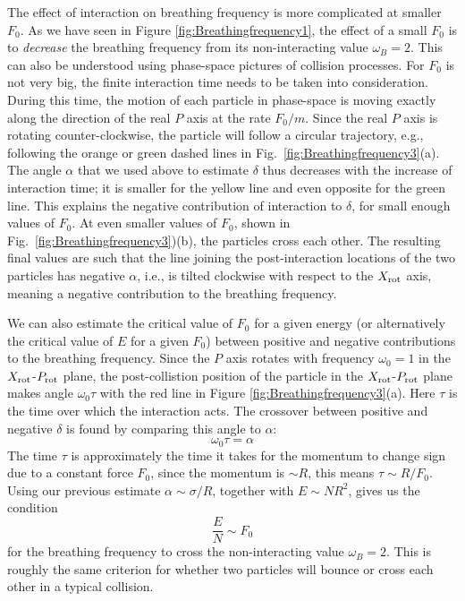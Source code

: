\documentclass[aps,preprintnumbers,onecolumn,amsmath,amssymb,floatfix,pra]{revtex4-1}
\begin{document}
The effect of interaction on breathing frequency is more complicated at smaller $F_0$.  As we have
seen in Figure \ref{fig:Breathingfrequency1}, the effect of a small $F_0$ is to \emph{decrease} the
breathing frequency from its non-interacting value $\omega_B=2$.  This can also be understood using
phase-space pictures of collision processes.  For $F_0$ is not very big, the finite interaction time
needs to be taken into consideration.  During this time, the motion of each particle in phase-space
is moving exactly along the direction of the real $P$ axis at the rate $F_0/m$. Since the real $P$
axis is rotating counter-clockwise, the particle will follow a circular trajectory, e.g., following
the orange or green dashed lines in Fig.~\ref{fig:Breathingfrequency3}(a).  The angle $\alpha$ that
we used above to estimate $\delta$ thus decreases with the increase of interaction time; it is
smaller for the yellow line and even opposite for the green line.  This explains the negative
contribution of interaction to $\delta$, for small enough values of $F_0$.  At even smaller values
of $F_0$, shown in Fig.~\ref{fig:Breathingfrequency3})(b), the particles cross each other.  The
resulting final values are such that the line joining the post-interaction locations of the two
particles has negative $\alpha$, i.e., is tilted clockwise with respect to the $X_{\rm rot}$ axis,
meaning a negative contribution to the breathing frequency.

We can also estimate the critical value of $F_0$ for a given energy (or alternatively the critical
value of $E$ for a given $F_0$) between positive and negative contributions to the breathing
frequency.  Since the $P$ axis rotates with frequency $\omega_0=1$ in the $X_{\rm rot}$-$P_{\rm
  rot}$ plane, the post-collistion position of the particle in the $X_{\rm rot}$-$P_{\rm rot}$ plane
makes angle $\omega_0\tau$ with the red line in Figure \ref{fig:Breathingfrequency3}(a).  Here
$\tau$ is the time over which the interaction acts.  The crossover between positive and negative
$\delta$ is found by comparing this angle to $\alpha$:
\begin{equation}
\omega_0 \tau=\alpha
\end{equation}
The time $\tau$ is approximately the time it takes for the momentum to change sign due to a constant
force $F_0$, since the momentum is $\sim R$, this means $\tau\sim R/F_0$.  Using our previous
estimate  $\alpha\sim \sigma/R$, together with $E\sim NR^2$, gives us the condition
\begin{equation}
  \frac{E}{N} \sim F_0
  \label{eq_freq_turning_condition}
\end{equation}
for the breathing frequency to cross the non-interacting value $\omega_B=2$.  This is roughly the
same criterion for whether two particles will bounce or cross each other in a typical collision.
\end{document}
